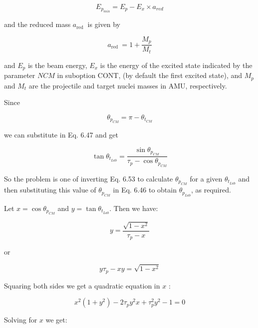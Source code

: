 \documentclass[10pt]{article}
\begin{document}
\begin{equation*}
E_{p_{m i n}}=E_{p}-E_{x} \times a_{r e d} \tag{6.50}
\end{equation*}


and the reduced mass $a_{\text {red }}$ is given by


\begin{equation*}
a_{\text {red }}=1+\frac{M_{p}}{M_{t}} \tag{6.51}
\end{equation*}


and $E_{p}$ is the beam energy, $E_{x}$ is the energy of the excited state indicated by the parameter $N C M$ in suboption CONT, (by default the first excited state), and $M_{p}$ and $M_{t}$ are the projectile and target nuclei masses in AMU, respectively.

Since


\begin{equation*}
\theta_{p_{C M}}=\pi-\theta_{t_{C M}} \tag{6.52}
\end{equation*}


we can substitute in Eq. 6.47 and get


\begin{equation*}
\tan \theta_{t_{L a b}}=\frac{\sin \theta_{p_{C M}}}{\tau_{p}-\cos \theta_{p_{C M}}} \tag{6.53}
\end{equation*}


So the problem is one of inverting Eq. 6.53 to calculate $\theta_{p_{C M}}$ for a given $\theta_{t_{L a b}}$ and then substituting this value of $\theta_{p_{C M}}$ in Eq. 6.46 to obtain $\theta_{p_{L a b}}$, as required.

Let $x=\cos \theta_{p_{C M}}$ and $y=\tan \theta_{t_{L a b}}$. Then we have:


\begin{equation*}
y=\frac{\sqrt{1-x^{2}}}{\tau_{p}-x} \tag{6.54}
\end{equation*}


or


\begin{equation*}
y \tau_{p}-x y=\sqrt{1-x^{2}} \tag{6.55}
\end{equation*}


Squaring both sides we get a quadratic equation in $x$ :


\begin{equation*}
x^{2}\left(1+y^{2}\right)-2 \tau_{p} y^{2} x+\tau_{p}^{2} y^{2}-1=0 \tag{6.56}
\end{equation*}


Solving for $x$ we get:
\end{document}
